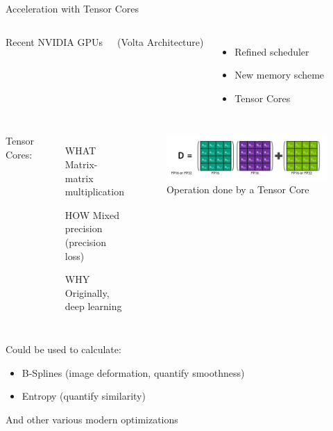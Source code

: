 \begin{frame}{Acceleration with Tensor Cores}
	

		\begin{columns}
			\hfill Recent NVIDIA GPUs
			
			\hfill (Volta Architecture)
			\begin{itemize}
				\item Refined scheduler
				\item New memory scheme
				\item Tensor Cores
			\end{itemize}
		\end{columns} 


	\begin{center}
		\begin{minipage}{0.88\textwidth}
			\begin{columns}
				\column{0.6\linewidth}
				Tensor Cores:
				\begin{itemize}
					\item[WHAT] Matrix-matrix multiplication
					\item[HOW] Mixed precision (precision loss)
					\item[WHY] Originally, deep learning
				\end{itemize}
				\column{0.5\linewidth}
				\begin{figure}
					\includegraphics[width=\textwidth]{tensor_core_op}
					\caption{Operation done by a Tensor Core}
				\end{figure}
			\end{columns}
		\end{minipage}
	
	\begin{minipage}{0.70\textwidth}
	Could be used to calculate:
	
	\begin{itemize}
		\item B-Splines (image deformation, quantify smoothness)
		\item Entropy (quantify similarity)
	\end{itemize}
	
	And other various modern optimizations
	\end{minipage}
	\end{center}

		
\end{frame}